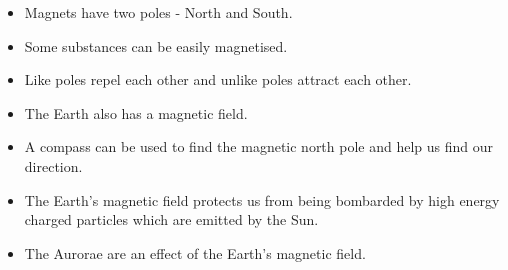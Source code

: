             \nopagebreak
      \label{m37830*id129673}\begin{itemize}[noitemsep] 
            \label{m37830*uid23}\item Magnets have two poles - North and South.
\label{m37830*uid24}\item Some substances can be easily magnetised.
\label{m37830*uid25}\item Like poles repel each other and unlike poles attract each other.
\label{m37830*uid26}\item The Earth also has a magnetic field.
\label{m37830*uid27}\item A compass can be used to find the magnetic north pole and help us find our direction.
\item The Earth's magnetic field protects us from being bombarded by high energy charged particles which are emitted by the Sun.
\item The Aurorae are an effect of the Earth's magnetic field. 
\end{itemize}
\pagebreak
